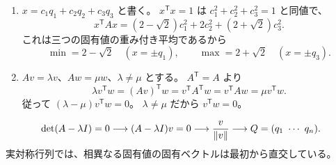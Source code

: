 \begin{enumerate}
  \item \(x=c_1q_1+c_2q_2+c_3q_3\) と書く。
  \(x^{\mathsf T}x=1\) は \(c_1^2+c_2^2+c_3^2=1\) と同値で、
  \[
  x^{\mathsf T}Ax
  =(2-\sqrt2)c_1^2+2c_2^2+(2+\sqrt2)c_3^2.
  \]
  これは三つの固有値の重み付き平均であるから
  \[
  \boxed{\min=2-\sqrt2\quad(x=\pm q_1)},
  \qquad
  \boxed{\max=2+\sqrt2\quad(x=\pm q_3)}.
  \]

  \item \(Av=\lambda v\)、\(Aw=\mu w\)、\(\lambda\ne\mu\) とする。
  \(A^{\mathsf T}=A\) より
  \[
  \lambda v^{\mathsf T}w
  =(Av)^{\mathsf T}w
  =v^{\mathsf T}A^{\mathsf T}w
  =v^{\mathsf T}Aw
  =\mu v^{\mathsf T}w.
  \]
  従って \((\lambda-\mu)v^{\mathsf T}w=0\)。
  \(\lambda\ne\mu\) だから \(\boxed{v^{\mathsf T}w=0}\)。
\end{enumerate}

\begin{pointbox}[対角化の順番]
\[
\det(A-\lambda I)=0
\longrightarrow
(A-\lambda I)v=0
\longrightarrow
\frac{v}{\lVert v\rVert}
\longrightarrow
Q=(q_1\ \cdots\ q_n).
\]
実対称行列では、相異なる固有値の固有ベクトルは最初から直交している。
\end{pointbox}


